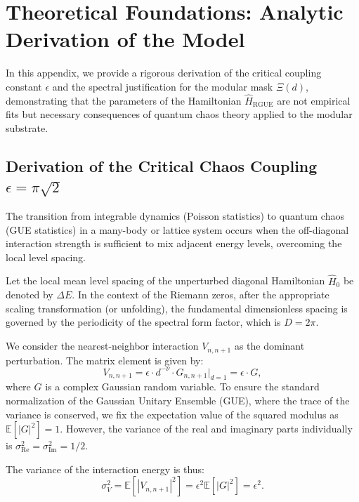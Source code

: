 \documentclass[prl,aps,floatfix,superscriptaddress,10pt]{revtex4-2}
\begin{document}
\section{Theoretical Foundations: Analytic Derivation of the Model}
\label{app:theory}

In this appendix, we provide a rigorous derivation of the critical coupling constant $\epsilon$ and the spectral justification for the modular mask $\Xi(d)$, demonstrating that the parameters of the Hamiltonian $\hat{H}_{\text{RGUE}}$ are not empirical fits but necessary consequences of quantum chaos theory applied to the modular substrate.

\subsection{Derivation of the Critical Chaos Coupling \texorpdfstring{$\epsilon = \pi\sqrt{2}$}{epsilon}}

The transition from integrable dynamics (Poisson statistics) to quantum chaos (GUE statistics) in a many-body or lattice system occurs when the off-diagonal interaction strength is sufficient to mix adjacent energy levels, overcoming the local level spacing.

Let the local mean level spacing of the unperturbed diagonal Hamiltonian $\hat{H}_0$ be denoted by $\Delta E$. In the context of the Riemann zeros, after the appropriate scaling transformation (or unfolding), the fundamental dimensionless spacing is governed by the periodicity of the spectral form factor, which is $D = 2\pi$.

We consider the nearest-neighbor interaction $V_{n, n+1}$ as the dominant perturbation. The matrix element is given by:
\begin{equation}
V_{n, n+1} = \epsilon \cdot d^{-\nu} \cdot G_{n, n+1} \bigg|_{d=1} = \epsilon \cdot G,
\end{equation}
where $G$ is a complex Gaussian random variable. To ensure the standard normalization of the Gaussian Unitary Ensemble (GUE), where the trace of the variance is conserved, we fix the expectation value of the squared modulus as $\mathbb{E}[|G|^2] = 1$. However, the variance of the real and imaginary parts individually is $\sigma^2_{\text{Re}} = \sigma^2_{\text{Im}} = 1/2$.

The variance of the interaction energy is thus:
\begin{equation}
\sigma_V^2 = \mathbb{E}[|V_{n, n+1}|^2] = \epsilon^2 \mathbb{E}[|G|^2] = \epsilon^2.
\end{equation}
\end{document}
